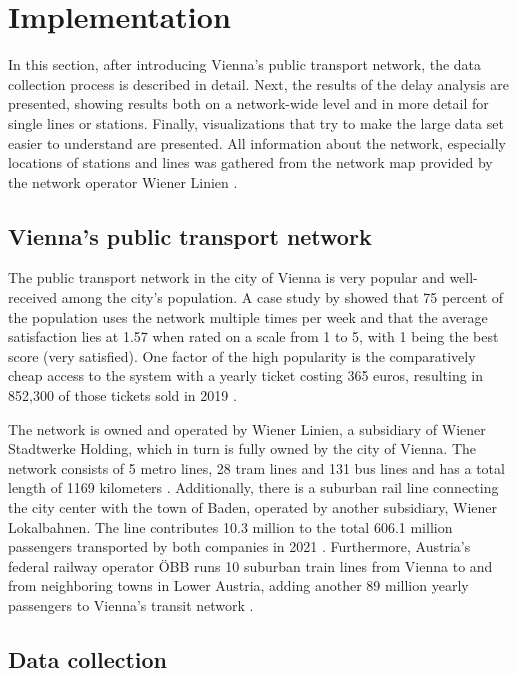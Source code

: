 \section{Implementation}
\label{sec:implementation}

In this section, after introducing Vienna's public transport network, the data collection process is described in detail. Next, the results of the delay analysis are presented, showing results both on a network-wide level and in more detail for single lines or stations. Finally, visualizations that try to make the large data set easier to understand are presented. All information about the network, especially locations of stations and lines was gathered from the network map provided by the network operator Wiener Linien \autocite{wiener-linien-2023}.

\subsection{Vienna's public transport network}

The public transport network in the city of Vienna is very popular
and well-received among the city's population. A case study by \textcite[917,921]{haslauer-2015} showed that 75 percent of the population uses the network multiple times per week and that the average satisfaction lies at 1.57 when rated on a scale from 1 to 5, with 1 being the best score (very satisfied). One factor of the high popularity is the comparatively cheap access to the system with a yearly ticket costing 365 euros, resulting in 852,300 of those tickets sold in 2019 \autocite{wiener-linien-2020}.  

The network is owned and operated by Wiener Linien, a subsidiary of Wiener Stadtwerke Holding, which in turn is fully owned by the city of Vienna.
The network consists of 5 metro lines, 28 tram lines and 131 bus lines and has a total length of 1169 kilometers \autocite{wiener-linien-2020}. Additionally, there is a suburban rail line connecting the city center with the town of Baden, operated by another subsidiary, Wiener Lokalbahnen. The line contributes 10.3 million to the total 606.1 million passengers transported by both companies in 2021 \autocite[24]{wiener-stadtwerke-2022}. Furthermore, Austria's federal railway operator ÖBB runs 10 suburban train lines from Vienna to and from neighboring towns in Lower Austria, adding another 89 million yearly passengers to Vienna's transit network \autocite{oebb-2023}.


\subsection{Data collection}

